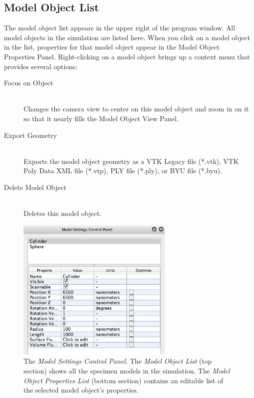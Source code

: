 \documentclass[11pt,titlepage,twoside]{article}
\begin{document}
\subsection{Model Object List}

The model object list appears in the upper right of the program window. All model objects in the simulation are listed here. When you click on a model object in the list, properties for that model object appear in the Model Object Properties Panel. Right-clicking on a model object brings up a context menu that provides several options:

\begin{description}

  \item[Focus on Object] \hfill \\
  Changes the camera view to center on this model object and zoom in on it so that it nearly fills the Model Object View Panel.
  
  \item[Export Geometry] \hfill \\
  Exports the model object geometry as a VTK Legacy file (*.vtk), VTK Poly Data XML file (*.vtp), PLY file (*.ply), or BYU file (*.byu).
  
  \item[Delete Model Object] \hfill \\
  Deletes this model object.

\end{description}

\begin{figure}[htbp] %
   \centering
   \includegraphics[width=3in]{images/ModelObjectProperties} 
   \caption{The \emph{Model Settings Control Panel}. The \emph{Model Object List} (top section) shows all the specimen models in the simulation. The \emph{Model Object Properties List} (bottom section) contains an editable list of the selected model object's properties.}
   \label{fig:example}
\end{figure}
\end{document}
